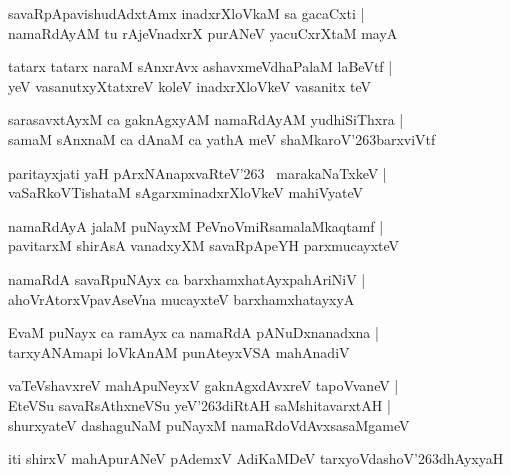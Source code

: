 \documentclass[twoside,12pt,openright]{book}
\def\S{\char'263}
\newcounter{shloka}[chapter]
\begin{document}
\begin{shloka}
savaRpApavishudAdxtAmx inadxrXloVkaM sa gacaCxti |\\
namaRdAyAM tu rAjeVnadxrX purANeV yacuCxrXtaM mayA
\end{shloka}

\begin{shloka}
tatarx tatarx naraM sAnxrAvx ashavxmeVdhaPalaM laBeVtf |\\
yeV vasanutxyXtatxreV koleV inadxrXloVkeV vasanitx teV 
\end{shloka}

\begin{shloka}
sarasavxtAyxM ca gaknAgxyAM namaRdAyAM yudhiSiThxra |\\
samaM sAnxnaM ca dAnaM ca yathA meV shaMkaroV\S barxviVtf
\end{shloka}

\begin{shloka}
paritayxjati yaH pArxNAnapxvaRteV\S~ marakaNaTxkeV |\\
vaSaRkoVTishataM sAgarxminadxrXloVkeV mahiVyateV 
\end{shloka}

\begin{shloka}
namaRdAyA jalaM puNayxM PeVnoVmiRsamalaMkaqtamf |\\
pavitarxM shirAsA vanadxyXM savaRpApeYH parxmucayxteV 
\end{shloka}

\begin{shloka}
namaRdA savaRpuNAyx ca barxhamxhatAyxpahAriNiV |\\
ahoVrAtorxVpavAseVna mucayxteV barxhamxhatayxyA 
\end{shloka}

\begin{shloka}
EvaM puNayx ca ramAyx ca namaRdA pANuDxnanadxna |\\
tarxyANAmapi loVkAnAM punAteyxVSA mahAnadiV 
\end{shloka}

\begin{shloka}
vaTeVshavxreV mahApuNeyxV gaknAgxdAvxreV tapoVvaneV |\\
EteVSu savaRsAthxneVSu yeV\S diRtAH saMshitavarxtAH |\\
shurxyateV dashaguNaM puNayxM namaRdoVdAvxsasaMgameV
\end{shloka}

\begin{center}
iti shirxV mahApurANeV pAdemxV AdiKaMDeV tarxyoVdashoV\S dhAyxyaH
\end{center}
\end{document}
